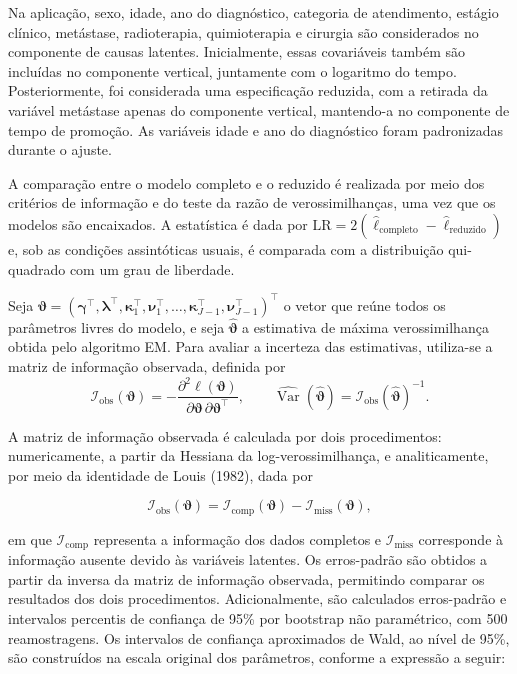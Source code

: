 \documentclass[11pt,a4paper]{article}
\begin{document}
Na aplicação, sexo, idade, ano do diagnóstico, categoria de atendimento, estágio clínico, metástase, radioterapia, quimioterapia e cirurgia são considerados no componente de causas latentes. Inicialmente, essas covariáveis também são incluídas no componente vertical, juntamente com o logaritmo do tempo. Posteriormente, foi considerada uma especificação reduzida, com a retirada da variável metástase apenas do componente vertical, mantendo-a no componente de tempo de promoção. As variáveis idade e ano do diagnóstico foram padronizadas durante o ajuste.

A comparação entre o modelo completo e o reduzido é realizada por meio dos critérios de informação e do teste da razão de verossimilhanças, uma vez que os modelos são encaixados. A estatística é dada por $\mathrm{LR}=2(\widehat\ell_{\mathrm{completo}}-\widehat\ell_{\mathrm{reduzido}})$ e, sob as condições assintóticas usuais, é comparada com a distribuição qui-quadrado com um grau de liberdade.


Seja $\boldsymbol{\vartheta} = \left(\boldsymbol{\gamma}^{\top},
\boldsymbol{\lambda}^{\top},\boldsymbol{\kappa}_{1}^{\top},\boldsymbol{\nu}_{1}^{\top},\ldots,\boldsymbol{\kappa}_{J-1}^{\top},\boldsymbol{\nu}_{J-1}^{\top}
\right)^{\top}$ o vetor que reúne todos os parâmetros livres do modelo, e seja $\widehat{\boldsymbol{\vartheta}}$ a estimativa de máxima verossimilhança obtida pelo algoritmo EM. Para avaliar a incerteza das estimativas, utiliza-se a matriz de informação observada, definida por
\begin{equation}
\mathcal I_{\mathrm{obs}}(\boldsymbol\vartheta)
=-\frac{\partial^2\ell(\boldsymbol\vartheta)}
{\partial\boldsymbol\vartheta\,\partial\boldsymbol\vartheta^\top},
\qquad
\widehat{\operatorname{Var}}(\widehat{\boldsymbol\vartheta})
=\mathcal I_{\mathrm{obs}}(\widehat{\boldsymbol\vartheta})^{-1}.
\end{equation}

A matriz de informação observada é calculada por dois procedimentos: numericamente, a partir da Hessiana da log-verossimilhança, e analiticamente, por meio da identidade de Louis (1982), dada por

\begin{equation}
\mathcal I_{\mathrm{obs}}(\boldsymbol\vartheta)
=
\mathcal I_{\mathrm{comp}}(\boldsymbol\vartheta)
-
\mathcal I_{\mathrm{miss}}(\boldsymbol\vartheta),
\end{equation}

\noindent em que \(\mathcal I_{\mathrm{comp}}\) representa a informação dos dados completos e \(\mathcal I_{\mathrm{miss}}\) corresponde à informação ausente devido às variáveis latentes. Os erros-padrão são obtidos a partir da inversa da matriz de informação observada, permitindo comparar os resultados dos dois procedimentos. Adicionalmente, são calculados erros-padrão e intervalos percentis de confiança de 95\% por bootstrap não paramétrico, com 500 reamostragens. Os intervalos de confiança aproximados de Wald, ao nível de 95\%, são construídos na escala original dos parâmetros, conforme a expressão a seguir:
\end{document}
